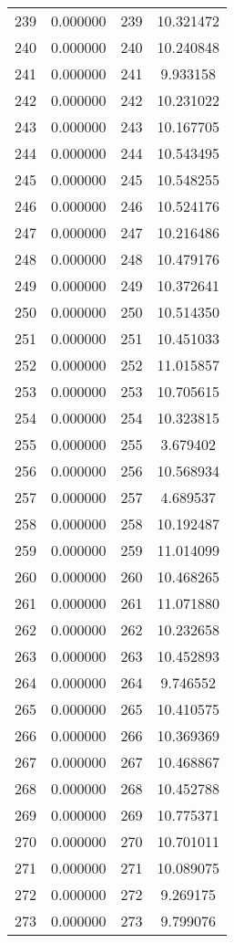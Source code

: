 \documentclass[12pt]{article}
\begin{document}
\begin{longtable}{@{}cccc@{}}
239 & 0.000000 & 239 & 10.321472 \\
240 & 0.000000 & 240 & 10.240848 \\
241 & 0.000000 & 241 & 9.933158 \\
242 & 0.000000 & 242 & 10.231022 \\
243 & 0.000000 & 243 & 10.167705 \\
244 & 0.000000 & 244 & 10.543495 \\
245 & 0.000000 & 245 & 10.548255 \\
246 & 0.000000 & 246 & 10.524176 \\
247 & 0.000000 & 247 & 10.216486 \\
248 & 0.000000 & 248 & 10.479176 \\
249 & 0.000000 & 249 & 10.372641 \\
250 & 0.000000 & 250 & 10.514350 \\
251 & 0.000000 & 251 & 10.451033 \\
252 & 0.000000 & 252 & 11.015857 \\
253 & 0.000000 & 253 & 10.705615 \\
254 & 0.000000 & 254 & 10.323815 \\
255 & 0.000000 & 255 & 3.679402 \\
256 & 0.000000 & 256 & 10.568934 \\
257 & 0.000000 & 257 & 4.689537 \\
258 & 0.000000 & 258 & 10.192487 \\
259 & 0.000000 & 259 & 11.014099 \\
260 & 0.000000 & 260 & 10.468265 \\
261 & 0.000000 & 261 & 11.071880 \\
262 & 0.000000 & 262 & 10.232658 \\
263 & 0.000000 & 263 & 10.452893 \\
264 & 0.000000 & 264 & 9.746552 \\
265 & 0.000000 & 265 & 10.410575 \\
266 & 0.000000 & 266 & 10.369369 \\
267 & 0.000000 & 267 & 10.468867 \\
268 & 0.000000 & 268 & 10.452788 \\
269 & 0.000000 & 269 & 10.775371 \\
270 & 0.000000 & 270 & 10.701011 \\
271 & 0.000000 & 271 & 10.089075 \\
272 & 0.000000 & 272 & 9.269175 \\
273 & 0.000000 & 273 & 9.799076 \\

\end{longtable}
\end{document}

